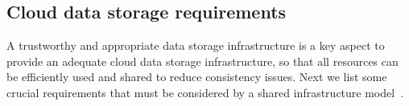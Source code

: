 \subsection{Cloud data storage requirements}
\label{sec:2.1}
A trustworthy and appropriate data storage infrastructure is a key aspect to %
provide an adequate cloud data storage infrastructure, 
so that all resources can be efficiently used and shared to reduce consistency issues. Next we list some crucial requirements that must be considered by a shared infrastructure model~\cite{Brewer2000, ju2011survey, rimal2009taxonomy}. \\

